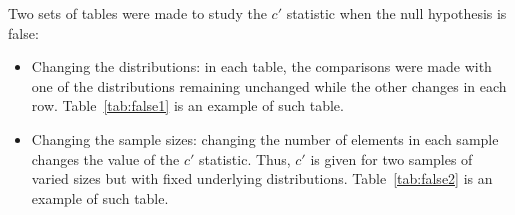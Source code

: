 \documentclass[12pt,fleqn]{article}
\begin{document}
Two sets of tables were made to study the $c'$ statistic when
the null hypothesis is false:
\begin{itemize}
	\item Changing the distributions: in each table, the comparisons were made with
one of the distributions remaining unchanged
while the other changes in each row.
Table~\ref{tab:false1} is an example of such table.
	\item Changing the sample sizes:
		changing the number of elements in each sample
		changes the value of the $c'$ statistic. 
		Thus, $c'$ is given for two samples of varied sizes but
		with fixed underlying distributions.         
		Table~\ref{tab:false2} is an example of such table.
\end{itemize}



\end{document}
